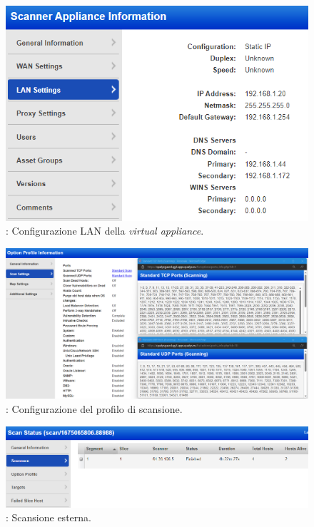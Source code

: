 \documentclass[target=bach,aauheader=]{thud}
\begin{document}
\pagebreak

\begin{figure}[h]
\centering
    \includegraphics[scale=0.7]{images/qualys_appliance2.png}
    \caption{: Configurazione LAN della \textit{virtual appliance}.}
    \label{fig:qualys_appliance}
\end{figure}

\begin{figure}[!]
\centering
    \includegraphics[scale=0.35]{images/qualys_scan-profile.png}
    \caption{: Configurazione del profilo di scansione.}
    \label{fig:qualys_scan-profile}
\end{figure}

\begin{figure}[!]
\centering
    \includegraphics[scale=0.6]{images/qualys_scan_ext.png}
    \caption{: Scansione esterna.}
    \label{fig:qualys_scan_ext}
\end{figure}
\end{document}
